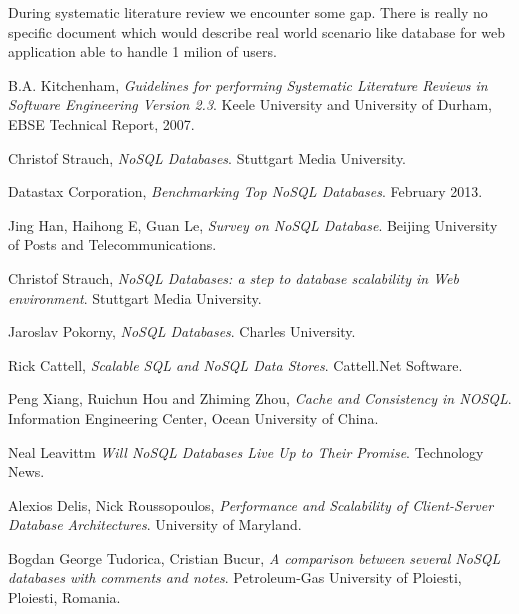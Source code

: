 \documentclass[times, 10pt,twocolumn]{article}
\begin{document}

During systematic literature review we encounter some gap.
There is really no specific document which would describe real world scenario like database for web 
application able to handle 1 milion of users.

\begin{thebibliography}{9}

	  B.A. Kitchenham,
	  \emph{Guidelines for performing Systematic Literature Reviews in Software Engineering Version 2.3}.
	  Keele University and University of Durham,
	  EBSE Technical Report,
	  2007.
  
  	  Christof Strauch, 
      \emph{NoSQL Databases}. Stuttgart Media University.
      
  	  Datastax Corporation, 
      \emph{Benchmarking Top NoSQL Databases}. February 2013.
      
  	  Jing Han, Haihong E, Guan Le,
      \emph{Survey on NoSQL Database}. Beijing University of Posts and Telecommunications.
      
  	  Christof Strauch, 
      \emph{NoSQL Databases: a step to database scalability in Web environment}. Stuttgart Media University.
      
  	   Jaroslav Pokorny, 
      \emph{NoSQL Databases}. Charles University.
      
  	  Rick Cattell, 
      \emph{Scalable SQL and NoSQL Data Stores}. Cattell.Net Software.
      
  	  Peng Xiang, Ruichun Hou and Zhiming Zhou, 
      \emph{Cache and Consistency in NOSQL}. Information Engineering Center, Ocean University of China.
      
  	  Neal Leavittm 
      \emph{Will NoSQL Databases Live Up to Their Promise}. Technology News.
      
  	  Alexios Delis, Nick Roussopoulos, 
      \emph{Performance and Scalability of Client-Server Database Architectures}. University of Maryland.
      
  	  Bogdan George Tudorica, Cristian Bucur, 
      \emph{A comparison between several NoSQL databases with comments and notes}. Petroleum-Gas University of Ploiesti, Ploiesti, Romania.
      

\end{thebibliography}
\end{document}
